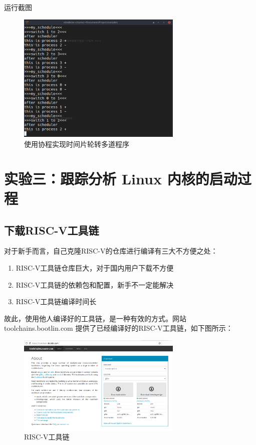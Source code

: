 \documentclass[lang=cn,10pt]{elegantbook}
\begin{document}
运行截图
\begin{figure}[htbp]
  \centering
  \includegraphics[width=0.7\textwidth]{image/image_2023-12-04_20-44-52.png}
  \caption{使用协程实现时间片轮转多道程序}
\end{figure}

\chapter{实验三：跟踪分析 Linux 内核的启动过程}
\section{下载RISC-V工具链}
对于新手而言，自己克隆RISC-V的仓库进行编译有三大不方便之处：

\begin{enumerate}
\item RISC-V工具链仓库巨大，对于国内用户下载不方便
\item RISC-V工具链的依赖包和配置，新手不一定能解决
\item RISC-V工具链编译时间长
\end{enumerate}

故此，使用他人编译好的工具链，是一种有效的方式。网站 toolchains.bootlin.com 提供了已经编译好的RISC-V工具链，如下图所示：

\begin{figure}[htbp]
  \centering
  \includegraphics[width=0.7\textwidth]{image/image-20231105091522260.png}
  \caption{RISC-V工具链}
\end{figure}
\end{document}
